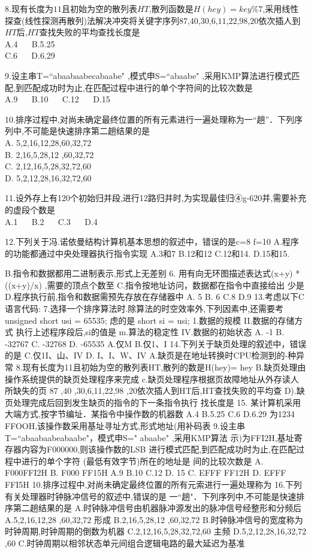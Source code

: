 8.现有长度为$11$且初始为空的散列表$HT$,散列函数是$H(hey)= key\%7$,采用线性探查(线性探测再散列)法解决冲突将关键字序列$87$,$40$,$30$,$6$,$11$,$22$,$98$,$20$依次插人到$HT$后,$HT$查找失败的平均查找长度是 \\
A.4 $\quad$ B.5.25 \\
C.6 $\quad$ D.6.29

9.设主串T=“abaabaabecabaabe" ,模式申S=“abaabe" ,采用KMP算法进行模式匹配,到匹配成功时为止,在匹配过程中进行的单个字符间的比较次数是 \\
A.9 $\quad$ B.10 $\quad$ C.12 $\quad$ D.15

10.排序过程中,对尚未确定最终位置的所有元素进行一遍处理称为一“趟”．下列序列中,不可能是快速排序第二趟结果的是 \\
A. 5,2,16,12,28,60,32,72 \\
B. 2,16,5,28,12 ,60,32,72 \\
C. 2,12,16,5,28,32,72,60 \\
D. 5,2,12,28,16,32,72,60

11.设外存上有120个初始归并段,进行12路归并时,为实现最佳归④g-620并,需要补充的虚段个数是 \\
A.1 $\quad$ B.2 $\quad$ C.3 $\quad$ D.4

12.下列关于冯.诺依曼结构计算机基本思想的叙述中，错误的是c=8
f=10
A.程序的功能都通过中央处理器执行指令实现
A.3和7
B.12和12
C.12和14.
D.15和15.

B.指令和数据都用二进制表示,形式上无差别
6. 用有向无环图描述表达式(x+y) * ((x+y)/x) ,需要的顶点个数至
C.指令按地址访问，数据都在指令中直接给出
少是
D.程序执行前,指令和数据需预先存放在存储器中
A. 5
B. 6
C.8
D.9
13.考虑以下C语言代码:
7.选择一个排序算法时.除算法的时空效率外,下列因素中,还需要考
unsigned short usi = 65535;
虑的是
short si = usi;
1.数据的规模
II.数据的存储方式
执行上述程序段后,si的值是
m.算法的稳定性
IV.数据的初始状态
A. -1
B. -32767
C. -32768
D. -65535
A.仅M
B.仅1、I
14.下列关于缺页处理的叙述中，错误的是
C.仅1I、山、IV
D. I、I、W、IV
A.缺页是在地址转换时CPU检测到的-种异常
8.现有长度为11且初始为空的散列表HT,散列的数是H(hey)= hey
B.缺页处理由操作系统提供的缺页处理程序来完成
c.缺页处理程序根据页故障地址从外存读人所缺失的页
87 ,40 ,30,6,11,22,98 ,20依次插人到HT后,HT查找失败的平均查
D).缺页处理完成后回到发生缺页的指令的下一条指令执行
找长度是
15. 某计算机采用大端方式,按字节编址．某指令中操作数的机器数
A.4
B.5.25
C.6
D.6.29
为1234 FFOOH,该操作数采用基址寻址方式,形式地址(用补码表
9.设主串T=“abaabaabeabaabe"，模式申S=" abaabe" ,采用KMP算法
示)为FFI2H,基址寄存器内容为F000000,则该操作数的LSB
进行模式匹配,到匹配成功时为止,在匹配过程中进行的单个字符
(最低有效字节)所在的地址是
间的比较次数是
A. F000FFI2H
B. F000 FF15H
A.9
B.10
C.12
D. 15
C. EFFF FF12H
D. EFFF FFI5H
10.排序过程中,对尚未确定最终位置的所有元索进行一遍处理称为
16.下列有关处理器时钟脉冲信号的叙述中,错误的是
一“趟"．下列序列中,不可能是快速排序第二趟结果的是
A.时钟脉冲信号由机器脉冲源发出的脉冲信号经整形和分频后
A.5,2,16,12,28 ,60,32,72
形成
B.2,16,5,28,12 ,60,32,72
B.时钟脉冲信号的宽度称为时钟周期,时钟周期的倒数为机器
C.2,12,16,5,28,32,72,60
主频
D.5,2,12,28,16,32,72 ,60
C.时钟周期以相邻状态单元间组合逻辑电路的最大延迟为基准

